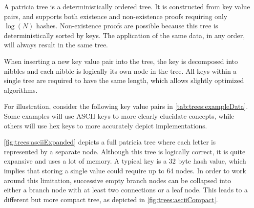 A patricia tree\cite{Morrison1968} is a deterministically ordered tree.
It is constructed from key value pairs, and supports both existence and non-existence proofs requiring only $\log(N)$ hashes.
Non-existence proofs are possible because this tree is deterministically sorted by keys.
The application of the same data, in any order, will always result in the same tree.

When inserting a new key value pair into the tree, the key is decomposed into nibbles and each nibble is logically its own node in the tree.
All keys within a single tree are required to have the same length, which allows slightly optimized algorithms.

For illustration, consider the following key value pairs in \autoref{tab:trees:exampleData}.
Some examples will use ASCII keys to more clearly elucidate concepts, while others will use hex keys to more accurately depict \codenamespace implementations.

\autoref{fig:trees:asciiExpanded} depicts a full patricia tree where each letter is represented by a separate node.
Although this tree is logically correct, it is quite expansive and uses a lot of memory.
A typical key is a 32 byte hash value, which implies that storing a single value could require up to 64 nodes.
In order to work around this limitation, successive empty branch nodes can be collapsed into either a branch node with at least two connections or a leaf node.
This leads to a different but more compact tree, as depicted in \autoref{fig:trees:asciiCompact}.

\begin{table}[ht]
\end{table}

\begin{figure}[H]
\end{figure}

